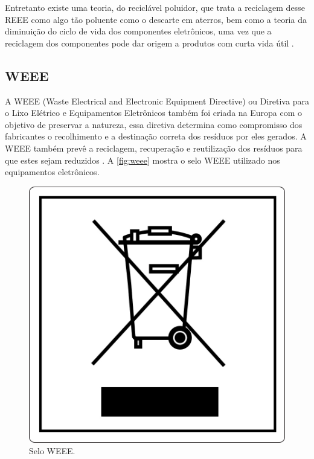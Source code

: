 Entretanto existe uma teoria, do reciclável poluidor, que trata a reciclagem desse REEE como algo tão poluente como o descarte em aterros, bem como a teoria da diminuição do ciclo de vida dos componentes eletrônicos, uma vez que a reciclagem dos componentes pode dar origem a produtos com curta vida útil \cite{garcia2015tecnologia}.

\subsection{WEEE}

A WEEE (Waste Electrical and Electronic Equipment Directive) ou Diretiva para o Lixo Elétrico e Equipamentos Eletrônicos também foi criada na Europa com o objetivo de preservar a natureza, essa diretiva determina como compromisso dos fabricantes o recolhimento e a destinação correta dos resíduos por eles gerados. A WEEE também prevê a reciclagem, recuperação e reutilização dos resíduos para que estes sejam reduzidos \cite{neto2015ti}. A \autoref{fig:weee} mostra o selo WEEE utilizado nos equipamentos eletrônicos.

\begin{figure}[htb]
	\caption{\label{fig:weee}Selo WEEE.}
	\begin{center}
	    \includegraphics[scale=0.45]{imagens/weee.jpg}
	\end{center}
\end{figure}

